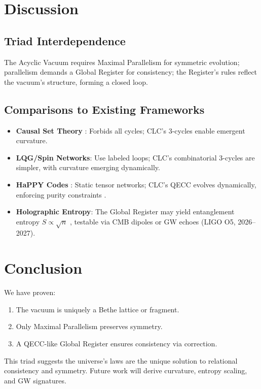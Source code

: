 \documentclass[11pt, a4paper]{article}
\begin{document}
\section{Discussion}

\subsection{Triad Interdependence}
The Acyclic Vacuum requires Maximal Parallelism for symmetric evolution; parallelism demands a Global Register for consistency; the Register’s rules reflect the vacuum’s structure, forming a closed loop.

\subsection{Comparisons to Existing Frameworks}
\begin{itemize}
  \item \textbf{Causal Set Theory} \cite{dowker2003}: Forbids all cycles; CLC’s 3-cycles enable emergent curvature.
  \item \textbf{LQG/Spin Networks}: Use labeled loops; CLC’s combinatorial 3-cycles are simpler, with curvature emerging dynamically.
  \item \textbf{HaPPY Codes} \cite{pastawski2015}: Static tensor networks; CLC’s QECC evolves dynamically, enforcing purity constraints \cite{fisher2025}.
  \item \textbf{Holographic Entropy}: The Global Register may yield entanglement entropy $S \propto \sqrt{n}$ \cite{ryu2006}, testable via CMB dipoles or GW echoes (LIGO O5, 2026–2027).
\end{itemize}

\section{Conclusion}
We have proven:
\begin{enumerate}
  \item The vacuum is uniquely a Bethe lattice or fragment.
  \item Only Maximal Parallelism preserves symmetry.
  \item A QECC-like Global Register ensures consistency via correction.
\end{enumerate}
This triad suggests the universe’s laws are the unique solution to relational consistency and symmetry. Future work will derive curvature, entropy scaling, and GW signatures.
\end{document}
